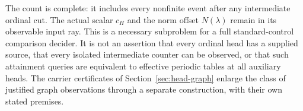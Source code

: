The count is complete: it includes every nonfinite event after any
intermediate ordinal cut. The actual scalar $c_H$ and the norm offset
$N(\lambda)$ remain in its observable input ray. This is a necessary
subproblem for a full standard-control comparison decider. It is not
an assertion that every ordinal head has a supplied source, that every
isolated intermediate counter can be observed, or that such attainment
queries are equivalent to effective periodic tables at all auxiliary
heads. The carrier certificates of Section~\ref{sec:head-graph}
enlarge the class of justified graph observations through a separate
construction, with their own stated premises.
